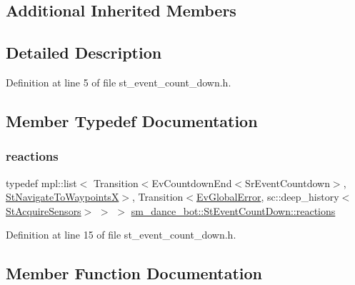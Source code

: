 \subsection*{Additional Inherited Members}


\subsection{Detailed Description}


Definition at line 5 of file st\+\_\+event\+\_\+count\+\_\+down.\+h.



\subsection{Member Typedef Documentation}
\mbox{\label{structsm__dance__bot_1_1StEventCountDown_ade51ecb44d2be45e1e4757abd4da456b}} 
\subsubsection{\texorpdfstring{reactions}{reactions}}
{\footnotesize\ttfamily typedef mpl\+::list$<$ Transition$<$Ev\+Countdown\+End$<$Sr\+Event\+Countdown$>$, \hyperlink{structsm__dance__bot_1_1StNavigateToWaypointsX}{St\+Navigate\+To\+WaypointsX}$>$, Transition$<$\hyperlink{structsm__dance__bot_1_1EvGlobalError}{Ev\+Global\+Error}, sc\+::deep\+\_\+history$<$\hyperlink{structsm__dance__bot_1_1StAcquireSensors}{St\+Acquire\+Sensors}$>$ $>$ $>$ \hyperlink{structsm__dance__bot_1_1StEventCountDown_ade51ecb44d2be45e1e4757abd4da456b}{sm\+\_\+dance\+\_\+bot\+::\+St\+Event\+Count\+Down\+::reactions}}



Definition at line 15 of file st\+\_\+event\+\_\+count\+\_\+down.\+h.



\subsection{Member Function Documentation}
\mbox{\label{structsm__dance__bot_1_1StEventCountDown_a6095670c25c304d3839ee3a1a24ec193}} 
